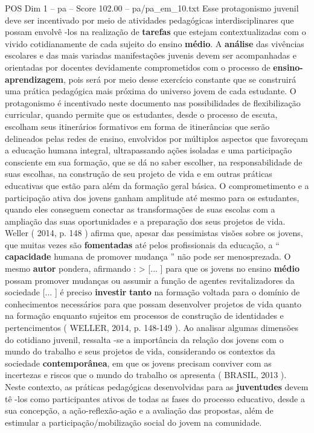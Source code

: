 \begin{textsample}{POS Dim 1 – pa – Score 102.00 – pa/pa\_em\_10.txt}
Esse protagonismo juvenil deve ser incentivado por meio de atividades pedagógicas interdisciplinares que possam envolvê -los na realização de \textbf{tarefas} que estejam contextualizadas com o vivido cotidianamente de cada sujeito do ensino \textbf{médio}.
A \textbf{análise} das vivências escolares e das mais variadas manifestações juvenis devem ser acompanhadas e orientadas por docentes devidamente comprometidos com o processo de \textbf{ensino-aprendizagem}, pois será por meio desse exercício constante que se construirá uma prática pedagógica mais próxima do universo jovem de cada estudante.
O protagonismo é incentivado neste documento nas possibilidades de flexibilização curricular, quando permite que os estudantes, desde o processo de escuta, escolham seus itinerários formativos em forma de itinerâncias que serão delineados pelas redes de ensino, envolvidos por múltiplos aspectos que favoreçam a educação humana integral, ultrapassando ações isoladas e uma participação consciente em sua formação, que se dá no saber escolher, na responsabilidade de suas escolhas, na construção de seu projeto de vida e em outras práticas educativas que estão para além da formação geral básica.
O comprometimento e a participação ativa dos jovens ganham amplitude até mesmo para os estudantes, quando eles conseguem conectar as transformações de suas escolas com a ampliação das suas oportunidades e a preparação dos seus projetos de vida.
Weller ( 2014, p. 148 ) afirma que, apesar das pessimistas visões sobre os jovens, que muitas vezes são \textbf{fomentadas} até pelos profissionais da educação, a “ \textbf{capacidade} humana de promover mudança ” não pode ser menosprezada.
O mesmo \textbf{autor} pondera, afirmando : > [... ] para que os jovens no ensino \textbf{médio} possam promover mudanças ou assumir a função de agentes revitalizadores da sociedade [... ] é preciso \textbf{investir} \textbf{tanto} na formação voltada para o domínio de conhecimentos necessários para que possam desenvolver projetos de vida quanto na formação enquanto sujeitos em processos de construção de identidades e pertencimentos ( WELLER, 2014, p. 148-149 ).
Ao analisar algumas dimensões do cotidiano juvenil, ressalta -se a importância da relação dos jovens com o mundo do trabalho e seus projetos de vida, considerando os contextos da sociedade \textbf{contemporânea}, em que os jovens precisam conviver com as incertezas e riscos que o mundo do trabalho os apresenta ( BRASIL, 2013 ).
Neste contexto, as práticas pedagógicas desenvolvidas para as \textbf{juventudes} devem tê -los como participantes ativos de todas as fases do processo educativo, desde a sua concepção, a ação-reflexão-ação e a avaliação das propostas, além de estimular a participação/mobilização social do jovem na comunidade.

\end{textsample}
